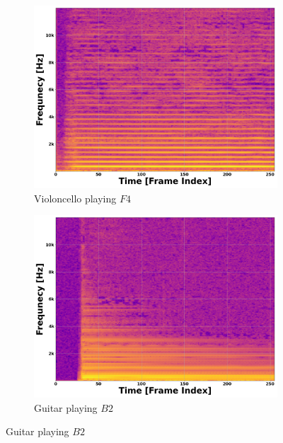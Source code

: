 \documentclass[12pt,letterpaper]{article}
\begin{document}
\begin{figure}[H]
	\begin{subfigure}{0.45\textwidth}
	\centering
	\includegraphics[scale=0.2]{../FiguresSpectrogram/CELLO-F4}
	\caption{Violoncello playing $F4$}
	\end{subfigure}
	\hfill
	\begin{subfigure}{0.45\textwidth}
	\centering
	\includegraphics[scale=0.2]{../FiguresSpectrogram/Guitar-B2}
	\caption{Guitar playing $B2$}
	\end{subfigure}
	

\end{figure}
\end{document}
